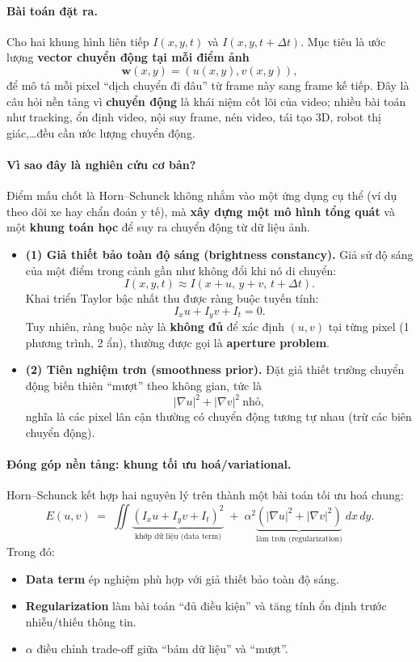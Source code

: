 \paragraph{Bài toán đặt ra.}
Cho hai khung hình liên tiếp $I(x,y,t)$ và $I(x,y,t+\Delta t)$. Mục tiêu là ước lượng \textbf{vector chuyển động tại mỗi điểm ảnh}
\[
\mathbf{w}(x,y) = (u(x,y), v(x,y)),
\]
để mô tả mỗi pixel ``dịch chuyển đi đâu'' từ frame này sang frame kế tiếp. Đây là câu hỏi nền tảng vì \textbf{chuyển động} là khái niệm cốt lõi của video; nhiều bài toán như tracking, ổn định video, nội suy frame, nén video, tái tạo 3D, robot thị giác,\ldots đều cần ước lượng chuyển động.

\paragraph{Vì sao đây là nghiên cứu cơ bản?}
Điểm mấu chốt là Horn--Schunck không nhắm vào một ứng dụng cụ thể (ví dụ theo dõi xe hay chẩn đoán y tế), mà \textbf{xây dựng một mô hình tổng quát} và một \textbf{khung toán học} để suy ra chuyển động từ dữ liệu ảnh.

\begin{itemize}
  \item \textbf{(1) Giả thiết bảo toàn độ sáng (brightness constancy).}
  Giả sử độ sáng của một điểm trong cảnh gần như không đổi khi nó di chuyển:
  \[
  I(x,y,t)\approx I(x+u,\,y+v,\,t+\Delta t).
  \]
  Khai triển Taylor bậc nhất thu được ràng buộc tuyến tính:
  \[
  I_x u + I_y v + I_t = 0.
  \]
  Tuy nhiên, ràng buộc này là \textbf{không đủ} để xác định $(u,v)$ tại từng pixel (1 phương trình, 2 ẩn), thường được gọi là \textbf{aperture problem}.

  \item \textbf{(2) Tiên nghiệm trơn (smoothness prior).}
  Đặt giả thiết trường chuyển động biến thiên ``mượt'' theo không gian, tức là
  \[
  |\nabla u|^2 + |\nabla v|^2 \ \text{nhỏ},
  \]
  nghĩa là các pixel lân cận thường có chuyển động tương tự nhau (trừ các biên chuyển động).
\end{itemize}

\paragraph{Đóng góp nền tảng: khung tối ưu hoá/variational.}
Horn--Schunck kết hợp hai nguyên lý trên thành một bài toán tối ưu hoá chung:
\[
E(u,v) \;=\;
\iint
\underbrace{(I_x u + I_y v + I_t)^2}_{\text{khớp dữ liệu (data term)}}
\;+\;
\alpha^2\underbrace{\left(|\nabla u|^2 + |\nabla v|^2\right)}_{\text{làm trơn (regularization)}}
\;dx\,dy.
\]
Trong đó:
\begin{itemize}
  \item \textbf{Data term} ép nghiệm phù hợp với giả thiết bảo toàn độ sáng.
  \item \textbf{Regularization} làm bài toán ``đủ điều kiện'' và tăng tính ổn định trước nhiễu/thiếu thông tin.
  \item $\alpha$ điều chỉnh trade-off giữa ``bám dữ liệu'' và ``mượt''.
\end{itemize}

